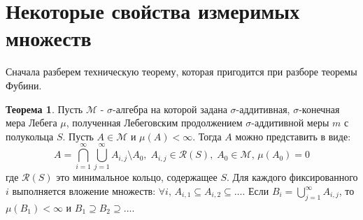 \documentclass[12pt]{article}
\newcommand{\MCR}{\mathcal{R}}
\newcommand{\MM}{\mathcal{M}}
\theoremstyle{definition}
\newtheorem{theorem}{Теорема}
\begin{document}
\section*{Некоторые свойства измеримых множеств}
Сначала разберем техническую теорему, которая пригодится при разборе теоремы Фубини.
\begin{theorem}
	Пусть $\MM$ - $\sigma$-алгебра на которой задана $\sigma$-аддитивная, $\sigma$-конечная мера Лебега $\mu$, полученная Лебеговским продолжением $\sigma$-аддитивной меры $m$ с полукольца $S$. Пусть $A \in \MM$ и $\mu(A) < \infty$. Тогда $A$ можно представить в виде:
	$$
		A = \bigcap\limits_{i = 1}^{\infty}\bigcup\limits_{j = 1}^{\infty}A_{i,j} \setminus A_0, \; A_{i,j} \in \MCR(S), \; A_0 \in \MM, \, \mu(A_0) = 0
	$$
	где $\MCR(S)$ это минимальное кольцо, содержащее $S$. Для каждого фиксированного $i$ выполняется вложение множеств: $\forall i, \, A_{i,1} \subseteq A_{i,2} \subseteq \dotsc$. Если $B_{i} = \bigcup\limits_{j = 1}^{\infty}A_{i,j}$, то $\mu(B_1) < \infty$ и $B_1 \supseteq B_2 \supseteq \dotsc$.
\end{theorem}
\end{document}
